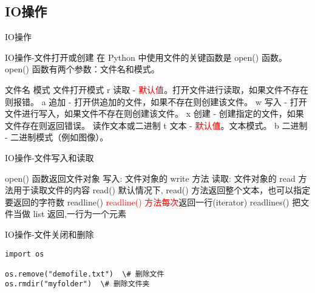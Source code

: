 \subsection{IO操作}
\begin{frame}[standout] IO操作 \end{frame}
\begin{frame}{IO操作-文件打开或创建}
    在 Python 中使用文件的关键函数是 open() 函数。
    open() 函数有两个参数：文件名和模式。
    \begin{myoutline}
        \1 文件名
        \1 模式
            \2 文件打开模式
                \3 r 读取 - \textcolor{red}{默认值}。打开文件进行读取，如果文件不存在则报错。
                \3 a 追加 - 打开供追加的文件，如果不存在则创建该文件。
                \3 w 写入 - 打开文件进行写入，如果文件不存在则创建该文件。
                \3 x 创建 - 创建指定的文件，如果文件存在则返回错误。
            \2 读作文本或二进制
                \3 t 文本 - \textcolor{red}{默认值}。文本模式。
                \3 b 二进制 - 二进制模式（例如图像）。
    \end{myoutline}
\end{frame}

\begin{frame}{IO操作-文件写入和读取}
    \begin{myoutline}
        \1 open() 函数返回文件对象
        \1 写入: 文件对象的 write 方法
        \1 读取: 文件对象的 read 方法用于读取文件的内容
            \2 read() 默认情况下, read() 方法返回整个文本，也可以指定要返回的字符数
            \2 readline() \textcolor{red}{readline() 方法每次}返回一行(iterator)
            \2 readlines() 把文件当做 list 返回,一行为一个元素
    \end{myoutline}


\end{frame}

\begin{frame}[fragile]{IO操作-文件关闭和删除}
    \begin{lstlisting}
import os

os.remove("demofile.txt")  \# 删除文件
os.rmdir("myfolder")  \# 删除文件夹
    \end{lstlisting}
\end{frame}